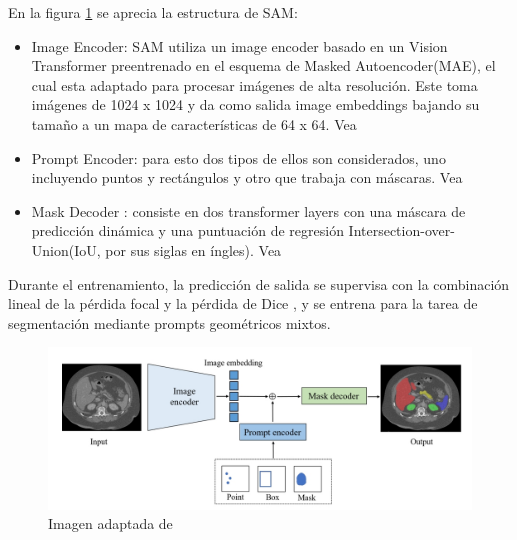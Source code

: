 \documentclass[12pt]{article}
\begin{document}
		En la figura \ref{fig:fig1} se aprecia la estructura de SAM:
		\begin{itemize}
			\item[1] Image Encoder: SAM utiliza un image encoder basado en un Vision Transformer  preentrenado en el esquema de Masked Autoencoder(MAE), el cual esta adaptado para procesar im\'agenes de alta resoluci\'on. Este toma im\'agenes de 1024 x 1024 y da como salida image embeddings bajando su tama\~no a un mapa de caracter\'isticas de 64 x 64. Vea \cite{Zhang2024SegmentAnything}
			
			\item[2] Prompt Encoder: para esto dos tipos de ellos son considerados, uno incluyendo puntos y rect\'angulos y otro que trabaja con m\'ascaras. Vea \cite{Zhang2024SegmentAnything}
			
			\item[3] Mask Decoder : consiste en dos transformer layers con una m\'ascara de predicci\'on din\'amica y  una puntuaci\'on de regresi\'on Intersection-over-Union(IoU, por sus siglas en \'ingles). Vea \cite{Zhang2024SegmentAnything}
		\end{itemize}
		
		Durante el entrenamiento, la predicción de salida se supervisa con la combinación lineal de la pérdida focal \parencite{Lin2017FocalLF} y la pérdida de Dice \parencite{Milletari2016VNet} , y se entrena para la tarea de segmentación mediante prompts geométricos mixtos.
		
		
		
		\begin{figure}[h] 
			\centering
			\caption{ Imagen adaptada de \cite{Zhang2024SegmentAnything}}
			\includegraphics[width=1\textwidth]{1.jpeg}
			
			\label{fig:fig1}
			
			
		\end{figure}
		
		
		
\end{document}
